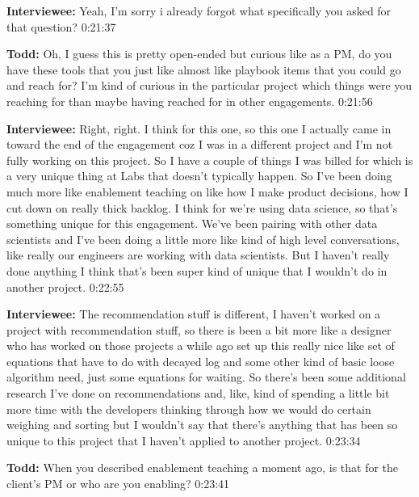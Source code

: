 \textbf{Interviewee:} Yeah, I'm sorry i already forgot what specifically you asked for that question?   0:21:37

\textbf{Todd:} Oh, I guess this is pretty open-ended but curious like as a PM, do you have these tools that you just like almost like playbook items that you could go and reach for?  I'm kind of curious in the particular project which things were you reaching for than maybe having reached for in other engagements.   0:21:56

\textbf{Interviewee:} Right, right.  I think for this one, so this one I actually came in toward the end of the engagement coz I was in a different project and I'm not fully working on this project.  So I have a couple of things I was billed for which is a very unique thing at Labs that doesn't typically happen. So I've been doing much more like enablement teaching on like how I make product decisions, how I cut down on really thick backlog.  I think for we're using data science, so that's something unique for this engagement.  We've been pairing with other data scientists and I've been doing a little more like kind of high level conversations, like really our engineers are working with data scientists.  But I haven't really done anything I think that's been super kind of unique that I wouldn't do in another project.   0:22:55

\textbf{Interviewee:} The recommendation stuff is different, I haven't worked on a project with recommendation stuff, so there is been a bit more like a designer who has worked on those projects a while ago set up this really nice like set of equations that have to do with decayed log and some other kind of basic loose algorithm need, just some equations for waiting.  So there's been some additional research I've done on recommendations and, like, kind of spending a little bit more time with the developers thinking through how we would do certain weighing and sorting but I wouldn't say that there's anything that has been so unique to this project that I haven't applied to another project.   0:23:34

\textbf{Todd:} When you described enablement teaching a moment ago, is that for the client's PM or who are you enabling?   0:23:41


